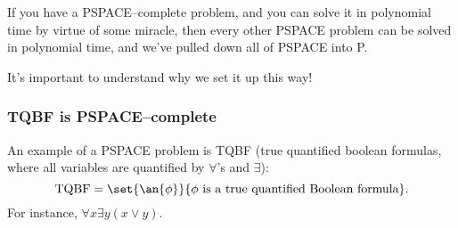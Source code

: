 If you have a PSPACE--complete problem, and you can solve it in polynomial time by virtue of some miracle, then every other PSPACE problem can be solved in polynomial time, and we've pulled down all of PSPACE into P.

It's important to understand why we set it up this way!

\subsubsection{TQBF is PSPACE--complete}

An example of a PSPACE problem is TQBF (true quantified boolean formulas, where all variables are quantified by $\forall$'s and $\exists$):
\[
\text{TQBF}=\set{\an{\phi}}{\phi\text{ is a true quantified Boolean formula}}.
\]
For instance, $\forall x\exists y (x\vee y)$.



